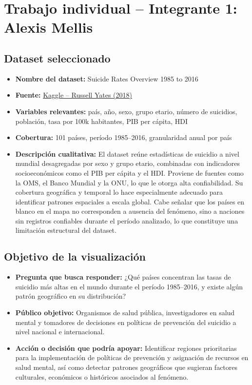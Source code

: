 \documentclass[12pt, letterpaper]{article}
\begin{document}
\section{Trabajo individual -- Integrante 1: Alexis Mellis}

\subsection{Dataset seleccionado}

\begin{itemize}
  \item \textbf{Nombre del dataset:} Suicide Rates Overview 1985 to 2016
  \item \textbf{Fuente:} \href{https://www.kaggle.com/datasets/russellyates88/suicide-rates-overview-1985-to-2016}{Kaggle -- Russell Yates (2018)}
  \item \textbf{Variables relevantes:} país, año, sexo, grupo etario, número de
        suicidios, población, tasa por 100k habitantes, PIB per cápita, HDI
  \item \textbf{Cobertura:} 101 países, período 1985--2016, granularidad anual por país
  \item \textbf{Descripción cualitativa:} El dataset reúne estadísticas de suicidio
        a nivel mundial desagregadas por sexo y grupo etario, combinadas con
        indicadores socioeconómicos como el PIB per cápita y el HDI. Proviene de
        fuentes como la OMS, el Banco Mundial y la ONU, lo que le otorga alta
        confiabilidad. Su cobertura geográfica y temporal lo hace especialmente
        adecuado para identificar patrones espaciales a escala global. Cabe señalar
        que los países en blanco en el mapa no corresponden a ausencia del fenómeno,
        sino a naciones sin registros confiables durante el período analizado,
        lo que constituye una limitación estructural del dataset.
\end{itemize}

\subsection{Objetivo de la visualización}

\begin{itemize}
  \item \textbf{Pregunta que busca responder:} ¿Qué países concentran las tasas
        de suicidio más altas en el mundo durante el período 1985--2016, y existe
        algún patrón geográfico en su distribución?
  \item \textbf{Público objetivo:} Organismos de salud pública, investigadores
        en salud mental y tomadores de decisiones en políticas de prevención del
        suicidio a nivel nacional e internacional.
  \item \textbf{Acción o decisión que podría apoyar:} Identificar regiones
        prioritarias para la implementación de políticas de prevención y asignación
        de recursos en salud mental, así como detectar patrones geográficos que
        sugieran factores culturales, económicos o históricos asociados al fenómeno.
\end{itemize}
\end{document}
